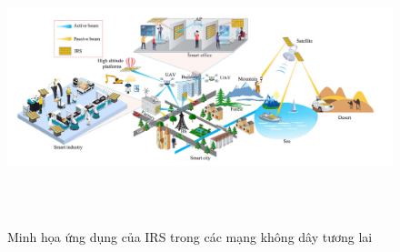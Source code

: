 \documentclass{article}
\begin{document}
\begin{figure}[h!]
    \centering
    \includegraphics[width =15cm, height = 8cm]{photo/2.4.3.png}
    \caption{Minh họa ứng dụng của IRS trong các mạng không dây tương lai}
    \label{Hình 7}
\end{figure}
\end{document}
